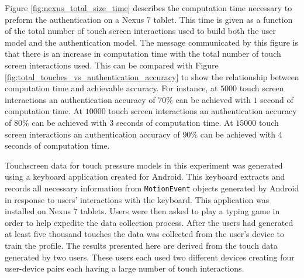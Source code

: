 %
Figure \ref{fig:nexus_total_size_time} describes the
computation time necessary to preform the authentication on a Nexus $7$ tablet.
This time is given as a function of
the total number of touch screen interactions used to build
both the user model and the authentication model.
%
The message communicated by this figure is 
that there is an increase in computation time 
with the total number of touch screen interactions used.
%
This can be compared with 
Figure \ref{fig:total_touches_vs_authentication_accuracy}
to show the relationship between 
computation time and achievable accuracy.
%
For instance,
at $5000$ touch screen interactions an authentication accuracy of $70\%$
can be achieved with $1$ second of computation time.
At $10000$ touch screen interactions an authentication accuracy of $80\%$
can be achieved with $3$ seconds of computation time.
At $15000$ touch screen interactions an authentication accuracy of $90\%$
can be achieved with $4$ seconds of computation time.



Touchscreen data for touch pressure models in this experiment 
was generated using a keyboard application created for Android. 
This keyboard extracts and records all necessary information 
from {\tt MotionEvent} objects generated by Android in response to
users' interactions with the keyboard.
%
This application was installed on Nexus $7$ tablets.
Users were then asked to play a typing game 
in order to help expedite the data collection process.
After the users had generated at least five thousand touches the data was collected from the user's device to train the profile.
%
The results presented here are derived from the touch data generated by two users.
These users each used two different devices creating four user-device pairs
each having a large number of touch interactions.


